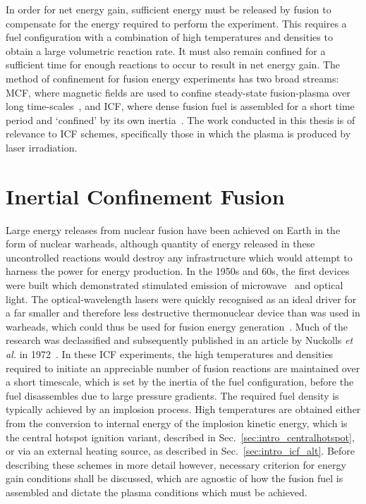 In order for net energy gain, sufficient energy must be released by fusion to compensate for the energy required to perform the experiment.
This requires a fuel configuration with a combination of high temperatures and densities to obtain a large volumetric reaction rate.
It must also remain confined for a sufficient time for enough reactions to occur to result in net energy gain.
The method of confinement for fusion energy experiments has two broad streams: \ac{MCF}, where magnetic fields are used to confine steady-state fusion-plasma over long time-scales~\cite{rebut_joint_2018}, and \ac{ICF}, where dense fusion fuel is assembled for a short time period and `confined' by its own inertia~\cite{nuckolls_laser_1972}.
The work conducted in this thesis is of relevance to \ac{ICF} schemes, specifically those in which the plasma is produced by laser irradiation.

\section{Inertial Confinement Fusion}%
\label{sec:intro_ICF}

Large energy releases from nuclear fusion have been achieved on Earth in the form of nuclear warheads, although quantity of energy released in these uncontrolled reactions would destroy any infrastructure which would attempt to harness the power for energy production.
In the 1950s and 60s, the first devices were built which demonstrated stimulated emission of microwave~\cite{schawlow_infrared_1958} and optical~\cite{maiman_stimulated_1960} light.
The optical-wavelength lasers were quickly recognised as an ideal driver for a far smaller and therefore less destructive thermonuclear device than was used in warheads, which could thus be used for fusion energy generation~\cite{nuckolls_early_1998}.
Much of the research was declassified and subsequently published in an article by Nuckolls \textit{et al.} in 1972~\cite{nuckolls_laser_1972}.
In these \ac{ICF} experiments, the high temperatures and densities required to initiate an appreciable number of fusion reactions are maintained over a short timescale, which is set by the inertia of the fuel configuration, before the fuel disassembles due to large pressure gradients.
The required fuel density is typically achieved by an implosion process.
High temperatures are obtained either from the conversion to internal energy of the implosion kinetic energy, which is the central hotspot ignition variant, described in Sec.~\ref{sec:intro_centralhotspot}, or via an external heating source, as described in Sec.~\ref{sec:intro_icf_alt}.
Before describing these schemes in more detail however, necessary criterion for energy gain conditions shall be discussed, which are agnostic of how the fusion fuel is assembled and dictate the plasma conditions which must be achieved.


